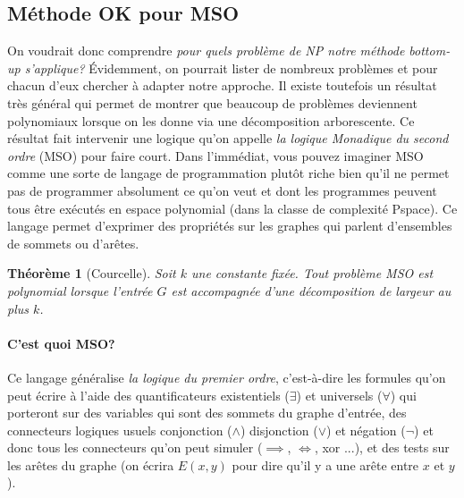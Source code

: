 \documentclass[a4paper,12pt]{article}
\newtheorem{theorem}{Théorème}
\theoremstyle{definition}
\theoremstyle{remark}
\begin{document}
\subsection*{Méthode OK pour MSO}
On voudrait donc comprendre \emph{pour quels problème de NP notre méthode
\emph{bottom-up} s'applique?} Évidemment, on pourrait lister de nombreux problèmes et
pour chacun d'eux chercher à adapter notre approche. Il existe
toutefois un résultat très général qui permet de montrer que beaucoup
de problèmes deviennent polynomiaux lorsque on les donne via une
décomposition arborescente. Ce résultat fait intervenir une logique
qu'on appelle \emph{la logique Monadique du second ordre} (MSO) pour faire
court. Dans l'immédiat, vous pouvez imaginer MSO comme une sorte de
langage de programmation plutôt riche bien qu'il ne permet pas de programmer absolument ce
qu'on veut et dont les programmes peuvent tous être exécutés en espace
polynomial (dans la classe de complexité Pspace).
Ce langage permet d'exprimer des propriétés sur les graphes qui
parlent d'ensembles de sommets ou d'arêtes.

\begin{theorem}[Courcelle]
  Soit $k$ une constante fixée.
  Tout problème MSO est polynomial lorsque l'entrée $G$ est
  accompagnée d'une décomposition de largeur au plus $k$.
\end{theorem}


\paragraph*{C'est quoi MSO?}
Ce langage généralise \emph{la logique du premier ordre}, c'est-à-dire
les formules qu'on peut écrire à l'aide des quantificateurs
existentiels ($\exists$) et universels ($\forall$) qui porteront sur
des variables qui sont des sommets du graphe d'entrée, des connecteurs
logiques usuels conjonction ($\land$) disjonction ($\lor$) et négation
($\lnot$) et donc tous les connecteurs qu'on peut simuler ($\implies$,
$\iff$, xor ...), et des tests sur les arêtes du graphe (on écrira
$E(x,y)$ pour dire qu'il y a une arête entre $x$ et $y$).
\end{document}
